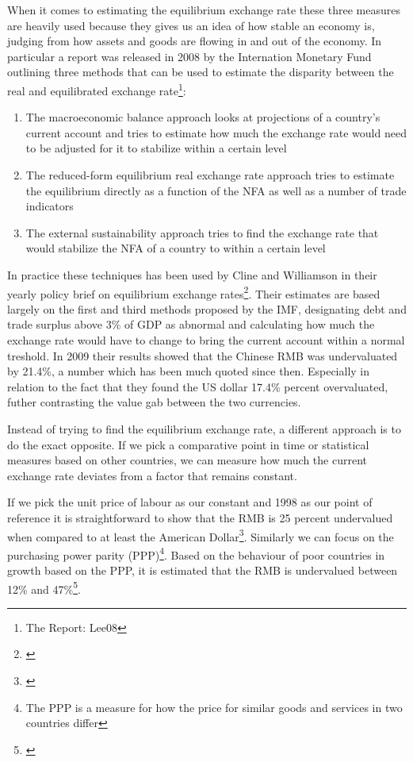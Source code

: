 \documentclass[11pt]{article}
\begin{document}
When it comes to estimating the equilibrium exchange rate these three 
measures are heavily used because they gives us an idea of how stable an 
economy is, judging from how assets and goods are flowing in and out of 
the economy. In particular a report was released in 2008 by the 
Internation Monetary Fund outlining three methods that can be used to 
estimate the disparity between the real and equilibrated exchange 
rate\footnote{The Report: \cite{pp.  1}{Lee08}}:

\begin{enumerate}
\item{The macroeconomic balance approach looks at projections of a 
	country's current account and tries to estimate how much the 
exchange rate would need to be adjusted for it to stabilize within a 
certain level}
\item{The reduced-form equilibrium real exchange rate approach tries to 
	estimate the equilibrium directly as a function of the NFA as well 
as a number of trade indicators}
\item{The external sustainability approach tries to find the exchange 
	rate that would stabilize the NFA of a country to within a certain 
level}
\end{enumerate}

In practice these techniques has been used by Cline and Williamson in 
their yearly policy brief on equilibrium exchange 
rates\footnote{\cite{cline2009,cline2012}}.  Their estimates are based 
largely on the first and third methods proposed by the IMF, designating 
debt and trade surplus above 3\% of GDP as abnormal and calculating how 
much the exchange rate would have to change to bring the current account 
within a normal treshold. In 2009 their results showed that the Chinese 
RMB was undervaluated by 21.4\%, a number which has been much quoted 
since then. Especially in relation to the fact that they found the US 
dollar 17.4\% percent overvaluated, futher contrasting the value gab 
between the two currencies.

Instead of trying to find the equilibrium exchange rate, a different 
approach is to do the exact opposite. If we pick a comparative point in 
time or statistical measures based on other countries, we can measure 
how much the current exchange rate deviates from a factor that remains 
constant.

If we pick the unit price of labour as our constant and 1998 as our 
point of reference it is straightforward to show that the RMB is 25 
percent undervalued when compared to at least the American 
Dollar\footnote{\cite{chimerica2009}}. Similarly we can focus on the 
purchasing power parity (PPP)\footnote{The PPP is a measure for how the 
price for similar goods and services in two countries differ}. Based on 
the behaviour of poor countries in growth based on the PPP, it is 
estimated that the RMB is undervalued between 12\% and 
47\%\footnote{\cite{Subramanian2010}}.
\end{document}
